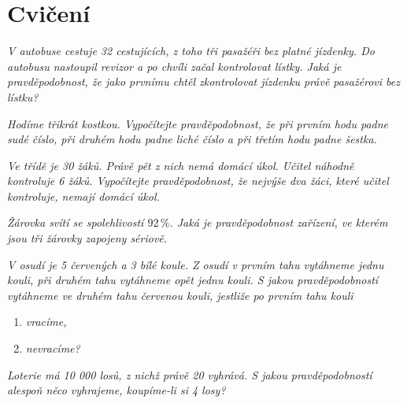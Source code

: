 \section{Cvičení}
\begin{exercise}\label{exercise:ch04_1}
    \textit{V autobuse cestuje 32 cestujících, z toho tři pasažéři bez platné jízdenky. Do autobusu nastoupil revizor a po chvíli začal kontrolovat lístky. Jaká je pravděpodobnost, že jako prvnímu chtěl zkontrolovat jízdenku právě pasažérovi bez lístku?} \cite{hackmath2022}
\end{exercise}
\begin{exercise}\label{exercise:ch04_2}
    \textit{Hodíme třikrát kostkou. Vypočítejte pravděpodobnost, že při prvním hodu padne sudé číslo, při druhém hodu padne liché číslo a při třetím hodu padne šestka.} \citep[str. 171]{Petakova2020}
\end{exercise}
\begin{exercise}\label{exercise:ch04_3}
    \textit{Ve třídě je 30 žáků. Právě pět z nich nemá domácí úkol. Učitel náhodně kontroluje 6 žáků. Vypočítejte pravděpodobnost, že nejvýše dva žáci, které učitel kontroluje, nemají domácí úkol.} \citep[str. 171]{Petakova2020}
\end{exercise}
\begin{exercise}\label{exercise:ch04_4}
    \textit{Žárovka svítí se spolehlivostí $92\,\%$. Jaká je pravděpodobnost zařízení, ve kterém jsou tři žárovky zapojeny sériově.} \citep[str. 172]{Petakova2020}
\end{exercise}
\begin{exercise}\label{exercise:ch04_5}
    \textit{V osudí je 5 červených a 3 bílé koule. Z osudí v prvním tahu vytáhneme jednu kouli, při druhém tahu vytáhneme opět jednu kouli. S jakou pravděpodobností vytáhneme ve druhém tahu červenou kouli, jestliže po prvním tahu kouli}
    \begin{enumerate}[label=(\alph*)]
        \item \textit{vracíme,}
        \item \textit{nevracíme?}
    \end{enumerate}
    \citep[str. 173]{Petakova2020}
\end{exercise}
\begin{exercise}\label{exercise:ch04_6}
    \textit{Loterie má 10 000 losů, z nichž právě 20 vyhrává. S jakou pravděpodobností alespoň něco vyhrajeme, koupíme-li si 4 losy?} \citep[str. 174]{Petakova2020}
\end{exercise}